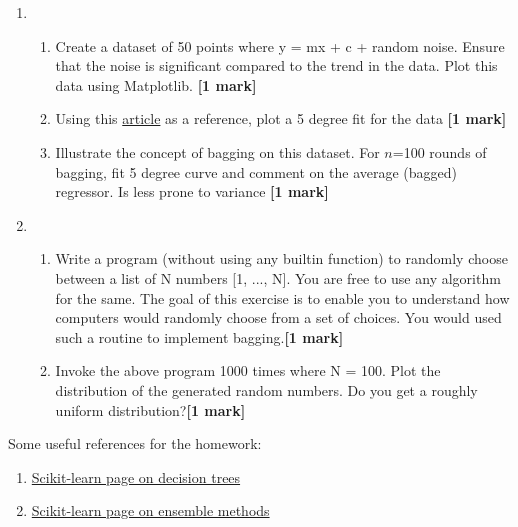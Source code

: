 \documentclass[colorlinks]{article}
\begin{document}
\begin{enumerate}
\item \begin{enumerate}
	\item Create a dataset of 50 points where y = mx + c +  random noise. Ensure that the noise is significant compared to the trend in the data. Plot this data using Matplotlib. \textbf{[1 mark]}
	\item Using this \href{https://www.scipy-lectures.org/intro/numpy/auto_examples/plot_polyfit.html}{article} as a reference, plot a 5 degree fit for the data \textbf{[1 mark]}
	\item Illustrate the concept of bagging on this dataset. For $n$=100 rounds of bagging, fit 5 degree curve and comment on the average (bagged) regressor. Is less prone to variance \textbf{[1 mark]}
\end{enumerate}


\item \begin{enumerate}
	\item Write a program (without using any builtin function) to randomly choose between a list of N numbers [1, ..., N]. You are free to use any algorithm for the same. The goal of this exercise is to enable you to understand how computers would randomly choose from a set of choices. You would used such a routine to implement bagging.\textbf{[1 mark]} 
	\item Invoke the above program 1000 times where N = 100. Plot the distribution of the generated random numbers. Do you get a roughly uniform distribution?\textbf{[1 mark]} 
\end{enumerate}



	
	
	

\end{enumerate}


Some useful references for the homework:

\begin{enumerate}
	\item \href{https://scikit-learn.org/stable/modules/tree.html}{Scikit-learn page on decision trees}
		\item \href{https://scikit-learn.org/stable/modules/ensemble.html}{Scikit-learn page on ensemble methods}
\end{enumerate}
\end{document}
